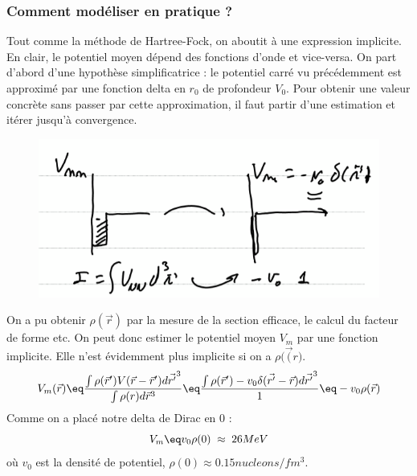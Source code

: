 \subsubsection{Comment modéliser en pratique ?}
Tout comme la méthode de Hartree-Fock, on aboutit à une expression implicite. En clair, le potentiel moyen dépend des fonctions d'onde et vice-versa. On part d'abord d'une hypothèse simplificatrice : le potentiel carré vu précédemment est approximé par une fonction delta en $r_0$ de profondeur $V_0$. Pour obtenir une valeur concrète sans passer par cette approximation, il faut partir d'une estimation et itérer jusqu'à convergence.
\begin{figure}[H]
    \centering
    \includegraphics[scale = 0.8]{Images4/delta_potentiel.PNG}
\end{figure}
On a pu obtenir $\rho(\Vec{r})$ par la mesure de la section efficace, le calcul du facteur de forme etc. On peut donc estimer le potentiel moyen $V_{m}$ par une fonction implicite. Elle n'est évidemment plus implicite si on a $\rho(\vec({r)}$.
\begin{equation*}
    V_m(\vec{r}) \eq \frac{\int \rho(\vec{r}')V(\vec{r}-\vec{r}')d\vec{r'}^3}{\int \rho(r)d\vec{r}^3}\eq \frac{\int \rho(\vec{r}')-v_0\delta(\vec{r'}-\vec{r})d\vec{r'}^3}{1}\eq -v_0 \rho(\vec{r})
\end{equation*}
Comme on a placé notre delta de Dirac en 0 :
\begin{equation*}
    V_m \eq v_0 \rho(0) \; \approx \; 26MeV
\end{equation*}
où $v_0$ est la densité de potentiel, $\rho(0) \approx 0.15nucleons/fm^3$.\\

